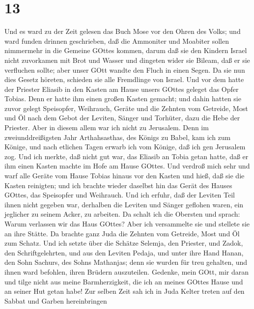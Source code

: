 \hypertarget{section-12}{%
\section{13}\label{section-12}}

 Und es ward zu der Zeit gelesen das Buch Mose vor den Ohren
des Volks; und ward funden drinnen geschrieben, daß die Ammoniter und
Moabiter sollen nimmermehr in die Gemeine GOttes kommen, 
darum daß sie den Kindern Israel nicht zuvorkamen mit Brot und Wasser
und dingeten wider sie Bileam, daß er sie verfluchen sollte; aber unser
GOtt wandte den Fluch in einen Segen.  Da sie nun dies
Gesetz höreten, schieden sie alle Fremdlinge von Israel. 
Und vor dem hatte der Priester Eliasib in den Kasten am Hause unsers
GOttes geleget das Opfer Tobias.  Denn er hatte ihm einen
großen Kasten gemacht; und dahin hatten sie zuvor gelegt Speisopfer,
Weihrauch, Geräte und die Zehnten vom Getreide, Most und Öl nach dem
Gebot der Leviten, Sänger und Torhüter, dazu die Hebe der Priester.
 Aber in diesem allem war ich nicht zu Jerusalem. Denn im
zweiunddreißigsten Jahr Arthahsasthas, des Königs zu Babel, kam ich zum
Könige, und nach etlichen Tagen erwarb ich vom Könige,  daß
ich gen Jerusalem zog. Und ich merkte, daß nicht gut war, das Eliasib an
Tobia getan hatte, daß er ihm einen Kasten machte im Hofe am Hause
GOttes.  Und verdroß mich sehr und warf alle Geräte vom
Hause Tobias hinaus vor den Kasten  und hieß, daß sie die
Kasten reinigten; und ich brachte wieder daselbst hin das Gerät des
Hauses GOttes, das Speisopfer und Weihrauch.  Und ich
erfuhr, daß der Leviten Teil ihnen nicht gegeben war, derhalben die
Leviten und Sänger geflohen waren, ein jeglicher zu seinem Acker, zu
arbeiten.  Da schalt ich die Obersten und sprach: Warum
verlassen wir das Haus GOttes? Aber ich versammelte sie und stellete sie
an ihre Stätte.  Da brachte ganz Juda die Zehnten vom
Getreide, Most und Öl zum Schatz.  Und ich setzte über die
Schätze Selemja, den Priester, und Zadok, den Schriftgelehrten, und aus
den Leviten Pedaja, und unter ihre Hand Hanan, den Sohn Sachurs, des
Sohns Mathanjas; denn sie wurden für treu gehalten, und ihnen ward
befohlen, ihren Brüdern auszuteilen.  Gedenke, mein GOtt,
mir daran und tilge nicht aus meine Barmherzigkeit, die ich an meines
GOttes Hause und an seiner Hut getan habe!  Zur selben Zeit
sah ich in Juda Kelter treten auf den Sabbat und Garben hereinbringen
